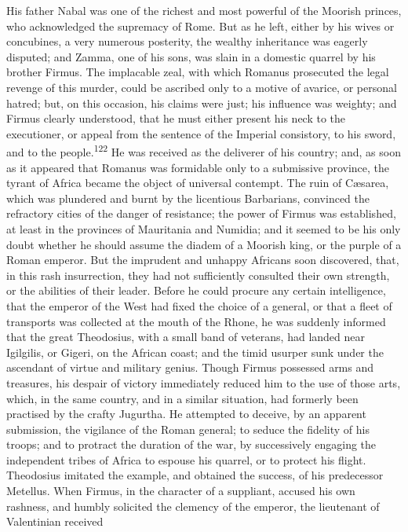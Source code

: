 {{{{{{{{{{{{{{{{{{{{{{{{{{{{{{{{{{{{{{{{{{{{{{{{{{{{{{{{{{{{{{{{{{{{{{{{{{{{{{{{{{{{{{{{{{{{{{{{{{{{{{{{{{{{{{{{{{{{{{{{{{{{{{{{{{{{His father Nabal was one of the richest and most powerful of the
Moorish princes, who acknowledged the supremacy of Rome. But as
he left, either by his wives or concubines, a very numerous
posterity, the wealthy inheritance was eagerly disputed; and
Zamma, one of his sons, was slain in a domestic quarrel by his
brother Firmus. The implacable zeal, with which Romanus
prosecuted the legal revenge of this murder, could be ascribed
only to a motive of avarice, or personal hatred; but, on this
occasion, his claims were just; his influence was weighty; and
Firmus clearly understood, that he must either present his neck
to the executioner, or appeal from the sentence of the Imperial
consistory, to his sword, and to the people.\textsuperscript{122} He was received
as the deliverer of his country; and, as soon as it appeared that
Romanus was formidable only to a submissive province, the tyrant
of Africa became the object of universal contempt. The ruin of
Cæsarea, which was plundered and burnt by the licentious
Barbarians, convinced the refractory cities of the danger of
resistance; the power of Firmus was established, at least in the
provinces of Mauritania and Numidia; and it seemed to be his only
doubt whether he should assume the diadem of a Moorish king, or
the purple of a Roman emperor. But the imprudent and unhappy
Africans soon discovered, that, in this rash insurrection, they
had not sufficiently consulted their own strength, or the
abilities of their leader. Before he could procure any certain
intelligence, that the emperor of the West had fixed the choice
of a general, or that a fleet of transports was collected at the
mouth of the Rhone, he was suddenly informed that the great
Theodosius, with a small band of veterans, had landed near
Igilgilis, or Gigeri, on the African coast; and the timid usurper
sunk under the ascendant of virtue and military genius. Though
Firmus possessed arms and treasures, his despair of victory
immediately reduced him to the use of those arts, which, in the
same country, and in a similar situation, had formerly been
practised by the crafty Jugurtha. He attempted to deceive, by an
apparent submission, the vigilance of the Roman general; to
seduce the fidelity of his troops; and to protract the duration
of the war, by successively engaging the independent tribes of
Africa to espouse his quarrel, or to protect his flight.
Theodosius imitated the example, and obtained the success, of his
predecessor Metellus. When Firmus, in the character of a
suppliant, accused his own rashness, and humbly solicited the
clemency of the emperor, the lieutenant of Valentinian received
}}}}}}}}}}}}}}}}}}}}}}}}}}}}}}}}}}}}}}}}}}}}}}}}}}}}}}}}}}}}}}}}}}}}}}}}}}}}}}}}}}}}}}}}}}}}}}}}}}}}}}}}}}}}}}}}}}}}}}}}}}}}}}}}}}}}
